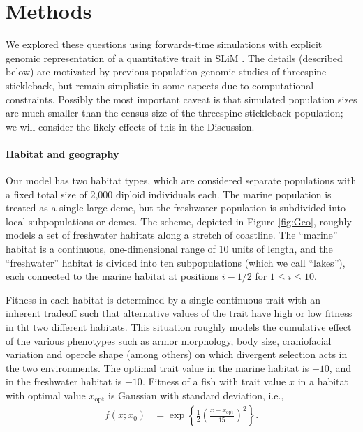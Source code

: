 \documentclass{article}
\newcommand{\plr}[1]{\todo[linecolor=blue,backgroundcolor=blue!25,bordercolor=blue]{#1}}
\begin{document}
\section{Methods}

We explored these questions
using forwards-time simulations with explicit genomic representation of a quantitative trait
in SLiM \citep{haller2017slim}.
The details (described below) are motivated by previous population genomic studies of threespine stickleback,
but remain simplistic in some aspects due to computational constraints.
Possibly the most important caveat is that simulated population sizes are much smaller
than the census size of the threespine stickleback population;
we will consider the likely effects of this in the Discussion.
\plr{TODO}


\paragraph{Habitat and geography}
Our model has two habitat types, which are considered separate populations
with a fixed total size of 2,000 diploid individuals each. The marine population is treated as a single large deme, but the freshwater population is subdivided into local subpopulations or demes.
The scheme, depicted in Figure \ref{fig:Geo},
roughly models a set of freshwater habitats
along a stretch of coastline.
The ``marine'' habitat  is a continuous, one-dimensional range of 10 units of length,
and the ``freshwater'' habitat is divided into ten subpopulations
(which we call ``lakes''), each connected to the marine habitat
at positions $i - 1/2$ for $1 \le i \le 10$.

Fitness in each habitat is determined by a single continuous trait with an inherent tradeoff such that alternative values of the trait have high or low fitness in tht two different habitats. This situation roughly models the cumulative effect of the various phenotypes
such as armor morphology, body size, craniofacial variation and opercle shape (among others)
on which divergent selection acts in the two environments.
The optimal trait value in the marine habitat is $+10$,
and in the freshwater habitat is $-10$. Fitness of a fish with trait value $x$ in a habitat with optimal value $x_\text{opt}$ is
Gaussian with standard deviation, i.e.,
\begin{align*}
    f(x; x_0)
    &=
    \exp\left\{
        \frac{1}{2}
            \left(
            \frac{x-x_\text{opt}}{15}
            \right)^2
        \right\} .
\end{align*}
\end{document}
